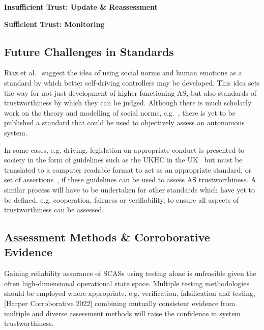 \noindent\textbf{Insufficient Trust: Update \& Reassessment}



\noindent\textbf{Sufficient Trust: Monitoring}











\subsection{Future Challenges in Standards}

Riaz et al.~\cite{Riaz2018} suggest the idea of using social norms and human emotions as a standard by which better self-driving controllers may be developed. This idea sets the way for not just development of higher functioning AS, but also standards of trustworthiness by which they can be judged. Although there is much scholarly work on the theory and modelling of social norms, e.g.~\cite{hechter2001social}, there is yet to be published a standard that could be used to objectively assess an autonomous system. 

In some cases, e.g. driving, legislation on appropriate conduct is presented to society in the form of guidelines such as the UKHC in the UK~\cite{highwayCode} but must be translated to a computer readable format to act as an appropriate standard, or set of assertions~\cite{harper2021safety}, if these guidelines can be used to assess AS trustworthiness. A similar process will have to be undertaken for other standards which have yet to be defined, e.g. cooperation, fairness or verifiability, to ensure all aspects of trustworthiness can be assessed. 



\subsection{Assessment Methods \& Corroborative Evidence}
Gaining reliability assurance of SCASs using testing alone is unfeasible given the often high-dimensional operational state space. Multiple testing methodologies should be employed where appropriate, e.g. verification, falsification and testing, [Harper Corroborative 2022] combining mutually consistent evidence from multiple and diverse assessment methods will raise the confidence in system trustworthiness.

